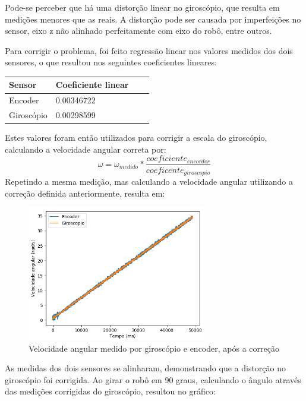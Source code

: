 \documentclass[
	12pt,				%
	openright,			%
	twoside,			%
	convert,
	a4paper,			%
	english,			%
	french,				%
	spanish,			%
	brazil				%
	]{abntex2}
\begin{document}
Pode-se perceber que há uma distorção linear no giroscópio, que resulta em medições menores que as reais. A distorção pode ser causada por imperfeições no sensor, eixo z não alinhado perfeitamente com eixo do robô, entre outros.
\par
Para corrigir o problema, foi feito regressão linear nos valores medidos dos dois sensores, o que resultou nos seguintes coeficientes lineares:
\begin{center}
\begin{tabular}{ | l | l | l | p{5cm} |}
    \hline
    Sensor & Coeficiente linear \\ \hline
    Encoder & 0.00346722 \\ \hline
    Giroscópio & 0.00298599 \\
    \hline
\end{tabular}
\end{center}
Estes valores foram então utilizados para corrigir a escala do giroscópio, calculando a velocidade angular correta por:
\begin{equation}
	\omega = \omega_{medido} * \frac{coeficiente_{encorder}}{coeficente_{giroscopio}}
\end{equation}
Repetindo a mesma medição, mas calculando a velocidade angular utilizando a correção definida anteriormente, resulta em:
\begin{figure}[H]
	\caption{Velocidade angular medido por giroscópio e encoder, após a correção}
\begin{center}
   \includegraphics[width=0.7\textwidth]{gyro_enc_comparacao_fix}
\end{center}
\end{figure}
As medidas dos dois sensores se alinharam, demonstrando que a distorção no giroscópio foi corrigida. Ao girar o robô em 90 graus, calculando o ângulo através das medições corrigidas do giroscópio, resultou no gráfico:
\end{document}
